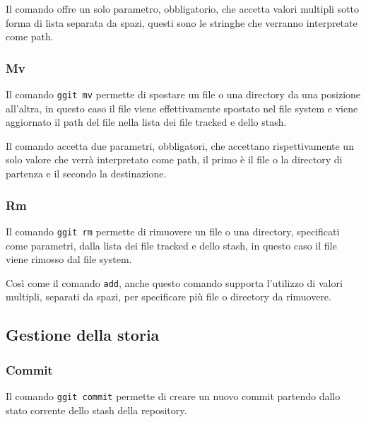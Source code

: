 Il comando offre un solo parametro, obbligatorio, che accetta valori multipli sotto forma di lista separata da spazi, questi sono le stringhe che verranno interpretate come path.

\subsubsection{Mv}
Il comando \texttt{ggit mv} permette di spostare un file o una directory da una posizione all'altra, in questo caso il file viene effettivamente spostato nel file system e viene aggiornato il path del file nella lista dei file tracked e dello stash.

Il comando accetta due parametri, obbligatori, che accettano rispettivamente un solo valore che verrà interpretato come path, il primo è il file o la directory di partenza e il secondo la destinazione.

\subsubsection{Rm}
Il comando \texttt{ggit rm} permette di rimuovere un file o una directory, specificati come parametri, dalla lista dei file tracked e dello stash, in questo caso il file viene rimosso dal file system.

Così come il comando \texttt{add}, anche questo comando supporta l'utilizzo di valori multipli, separati da spazi, per specificare più file o directory da rimuovere.

\subsection{Gestione della storia}
\subsubsection{Commit}
Il comando \texttt{ggit commit} permette di creare un nuovo commit partendo dallo stato corrente dello stash della repository.

